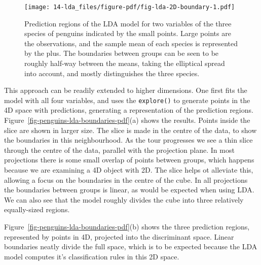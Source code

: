 \documentclass[
  letterpaper,
]{krantz}
\begin{document}
\begin{figure}[H]

{\centering \texttt{[image: 14-lda\_files/figure-pdf/fig-lda-2D-boundary-1.pdf]}

}

\caption{\label{fig-lda-2D-boundary}Prediction regions of the LDA model
for two variables of the three species of penguins indicated by the
small points. Large points are the observations, and the sample mean of
each species is represented by the plus. The boundaries between groups
can be seen to be roughly half-way between the means, taking the
elliptical spread into account, and mostly distinguishes the three
species.}

\end{figure}

  This approach can
be readily extended to higher dimensions. One first fits the model with
all four variables, and uses the \texttt{explore()} to generate points
in the 4D space with predictions, generating a representation of the
prediction regions. Figure~\ref{fig-penguins-lda-boundaries-pdf}(a)
shows the results. Points inside the slice are shown in larger size. The
slice is made in the centre of the data, to show the boundaries in this
neighbourhood. As the tour progresses we see a thin slice through the
centre of the data, parallel with the projection plane. In most
projections there is some small overlap of points between groups, which
happens because we are examining a 4D object with 2D. The slice helps ot
alleviate this, allowing a focus on the boundaries in the centre of the
cube. In all projections the boundaries between groups is linear, as
would be expected when using LDA. We can also see that the model roughly
divides the cube into three relatively equally-sized regions.

Figure~\ref{fig-penguins-lda-boundaries-pdf}(b) shows the three
prediction regions, represented by points in 4D, projected into the
discriminant space. Linear boundaries neatly divide the full space,
which is to be expected because the LDA model computes it's
classification rules in this 2D space.\\
\end{document}
